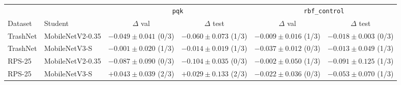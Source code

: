 \begin{tabular}{@{}llcccc@{}}
\toprule
 & & \multicolumn{2}{c}{\texttt{pqk}} & \multicolumn{2}{c}{\texttt{rbf\_control}} \\
\cmidrule(lr){3-4}\cmidrule(lr){5-6}
Dataset & Student & $\Delta$ val & $\Delta$ test & $\Delta$ val & $\Delta$ test \\
\midrule
TrashNet & MobileNetV2-0.35 & $-0.049\pm0.041$ (0/3) & $-0.060\pm0.073$ (1/3) & $-0.009\pm0.016$ (1/3) & $-0.018\pm0.003$ (0/3) \\
TrashNet & MobileNetV3-S & $-0.001\pm0.020$ (1/3) & $-0.014\pm0.019$ (1/3) & $-0.037\pm0.012$ (0/3) & $-0.013\pm0.049$ (1/3) \\
RPS-25 & MobileNetV2-0.35 & $-0.087\pm0.090$ (0/3) & $-0.104\pm0.035$ (0/3) & $-0.002\pm0.050$ (1/3) & $-0.091\pm0.125$ (1/3) \\
RPS-25 & MobileNetV3-S & $+0.043\pm0.039$ (2/3) & $+0.029\pm0.133$ (2/3) & $-0.022\pm0.036$ (0/3) & $-0.053\pm0.070$ (1/3) \\
\bottomrule
\end{tabular}
